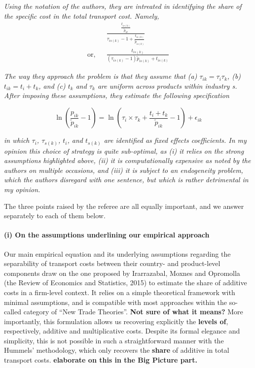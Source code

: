 \documentclass[a4paper,12pt]{article}
\begin{document}
\textit{Using the notation of the authors, they are intreated
in identifying the share of the specific cost in the total transport cost. Namely,}
\begin{eqnarray*}
&& \frac{\frac{t_{is(k)}}{\tilde{p}_{ik}}}{\tau_{is(k)}-1 + \frac{t_{is(k)}}{\tilde{p}_{is(k)}}} \\
\text{or,} &&\frac{t_{is(k)}}{(\tau_{is(k)}-1)\tilde{p}_{is(k)} + t_{is(k)}}
\end{eqnarray*}

\textit{The way they approach the problem is that they assume that (a) $\tau_{ik} = \tau_i\tau_{k}$,
(b) $t_{ik} = t_i +t_k$, and (c) $t_k$ and $\tau_k$ are uniform across products within industry
s. After imposing these assumptions, they estimate the following specification}

\begin{equation}
\ln\left(\frac{p_{ik}}{\widetilde{p}_{ik}}-1 \right)= \ln \left(\tau_{i} \times \tau_{k}+\frac{t_{i} + t_{k}}{\widetilde{p}_{ik}}-1 \right) + \epsilon_{ik} \label{eq:equation0}
\end{equation}

\textit{in which $\tau_i$, $\tau_{s(k)}$, $t_i$, and $t_{s(k)}$ are identified as fixed effects coefficients.
In my opinion this choice of strategy is quite sub-optimal, as (i) it relies on
the strong assumptions highlighted above, (ii) it is computationally expensive
as noted by the authors on multiple occasions, and (iii) it is subject to an
endogeneity problem, which the authors disregard with one sentence, but which
is rather detrimental in my opinion.}

The three points raised by the referee are all equally important, and we answer separately to each of them below.



\paragraph{(i) On the assumptions underlining our empirical approach} 
Our main empirical equation and its underlying assumptions regarding the separability of transport costs between their country- and product-level components draw on the one proposed by Irarrazabal, Moxnes and Opromolla (the Review of Economics and Statistics, 2015) to estimate the share of additive costs in a firm-level context. It relies on a simple theoretical framework with minimal assumptions, and is compatible with most approaches within the so-called category of ``New Trade Theories''. \textbf{Not sure of what it means? } More importantly, this formulation allows us recovering explicitly the \textbf{levels of}, respectively, additive and multiplicative costs. Despite its formal elegance and simplicity, this is not possible in such a straightforward manner with the Hummels' methodology, which only recovers the \textbf{share} of additive in total transport costs. \textbf{elaborate on this in the Big Picture part.}
\end{document}
